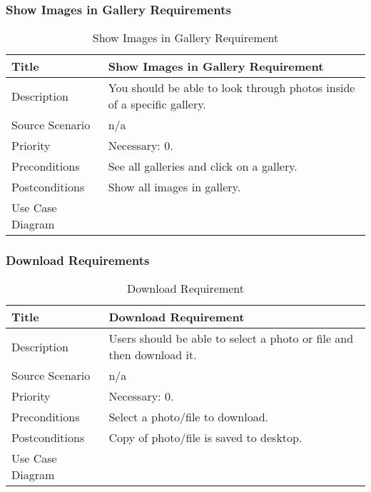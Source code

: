 \subsubsection{Show Images in Gallery Requirements}
  \begin{table}[h!]
    \caption{Show Images in Gallery Requirement}
    \label{system-requirements/functional-requirements/show-image-requirement}
    \begin{tabularx}{\textwidth}{|l|X|}
      \hline
      Title            & Show Images in Gallery Requirement \\ \hline
      Description      & You should be able to look through photos inside of a specific gallery. \\ \hline
      Source Scenario  & n/a \\ \hline
      Priority         & Necessary: 0. \\ \hline
      Preconditions    & See all galleries and click on a gallery. \\ \hline
      Postconditions   & Show all images in gallery. \\ \hline
      Use Case Diagram & \\ \hline
    \end{tabularx}
  \end{table}

\subsubsection{Download Requirements}
  \begin{table}[h!]
    \caption{Download Requirement}
    \label{system-requirements/functional-requirements/download-requirements}
    \begin{tabularx}{\textwidth}{|l|X|}
      \hline
      Title            & Download Requirement \\ \hline
      Description      & Users should be able to select a photo or file and then download it. \\ \hline
      Source Scenario  & n/a \\ \hline
      Priority         & Necessary: 0. \\ \hline
      Preconditions    & Select a photo/file to download. \\ \hline
      Postconditions   & Copy of photo/file is saved to desktop. \\ \hline
      Use Case Diagram & \\ \hline
    \end{tabularx}
  \end{table}
